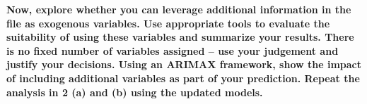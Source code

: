 \item \textbf{Now, explore whether you can leverage additional information in the file as exogenous variables. Use appropriate tools to evaluate the suitability of using these variables and summarize your results. There is no fixed number of variables assigned – use your judgement and justify your decisions.  Using an ARIMAX framework, show the impact of including additional variables as part of your prediction. Repeat the analysis in 2 (a) and (b) using the updated models.} 